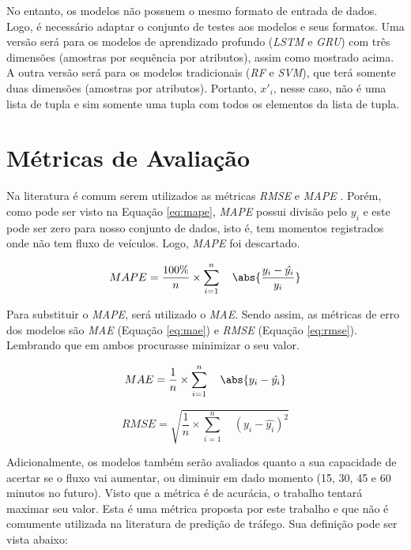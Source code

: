 No entanto, os modelos não possuem o mesmo formato de entrada de dados. Logo, é necessário adaptar o conjunto de testes aos modelos e seus formatos. Uma versão será para os modelos de aprendizado profundo (\textit{\acrshort{LSTM}} e \textit{\acrshort{GRU}}) com três dimensões (amostras por sequência por atributos), assim como mostrado acima. A outra versão será para os modelos tradicionais (\textit{\acrshort{RF}} e \textit{\acrshort{SVM}}), que terá somente duas dimensões (amostras por atributos). Portanto, \(x'_i\), nesse caso, não é uma lista de tupla e sim somente uma tupla com todos os elementos da lista de tupla.

\section{Métricas de Avaliação}

Na literatura é comum serem utilizados as métricas \textit{\acrshort{RMSE}} e \textit{\acrshort{MAPE}} \cite{lana_2018}. Porém, como pode ser visto na Equação \ref{eq:mape}, \textit{\acrshort{MAPE}} possui divisão pelo \({y_i}\) e este pode ser zero para nosso conjunto de dados, isto é, tem momentos registrados onde não tem fluxo de veículos. Logo, \textit{\acrshort{MAPE}} foi descartado. 

\begin{equation}
\label{eq:mape}
MAPE = \frac{100\%}{n} \times \sum_{i=1}^{n} \quad \abs{\frac{y_i - \hat{y_i}}{y_i}}
\end{equation}

Para substituir o \textit{\acrshort{MAPE}}, será utilizado o \textit{\acrshort{MAE}}. Sendo assim, as métricas de erro dos modelos são \textit{\acrshort{MAE}} (Equação \ref{eq:mae}) e \textit{\acrshort{RMSE}} (Equação \ref{eq:rmse}). Lembrando que em ambos procurasse minimizar o seu valor.

\begin{equation}
\label{eq:mae}
MAE = \frac{1}{n} \times \sum_{i=1}^{n} \quad \abs{y_i - \hat{y_i}}
\end{equation}

\begin{equation}
\label{eq:rmse}
RMSE = \sqrt{ \frac{1}{n} \times \sum_{i=1}^{n} \quad (y_i - \hat{y_i}) ^ 2}
\end{equation}

Adicionalmente, os modelos também serão avaliados quanto a sua capacidade de acertar se o fluxo vai aumentar, ou diminuir em dado momento (15, 30, 45 e 60 minutos no futuro). Visto que a métrica é de acurácia, o trabalho tentará maximar seu valor. Esta é uma métrica proposta por este trabalho e que não é comumente utilizada na literatura de predição de tráfego. Sua definição pode ser vista abaixo:

